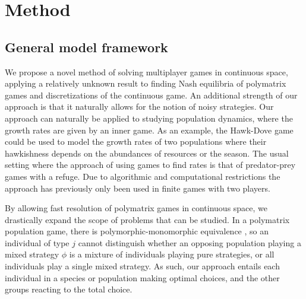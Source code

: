 \section{Method}
\subsection*{General model framework}

 We propose a novel method of solving multiplayer games in continuous space, applying a relatively unknown result to finding Nash equilibria of polymatrix games and discretizations of the continuous game. An additional strength of our approach is that it naturally allows for the notion of noisy strategies. Our approach can naturally be applied to studying population dynamics, where the growth rates are given by an inner game. As an example, the Hawk-Dove game could be used to model the growth rates of two populations where their hawkishness depends on the abundances of resources or the season. The usual setting where the approach of using games to find rates is that of predator-prey games with a refuge. Due to algorithmic and computational restrictions the approach has previously only been used in finite games with two players.

By allowing fast resolution of polymatrix games in continuous space, we drastically expand the scope of problems that can be studied. In a polymatrix population game, there is polymorphic-monomorphic equivalence \citep{cressmannbook}, so an individual of type $j$ cannot distinguish whether an opposing population playing a mixed strategy $\phi$ is a mixture of individuals playing pure strategies, or all individuals play a single mixed strategy. As such, our approach entails each individual in a species or population making optimal choices, and the other groups reacting to the total choice.


